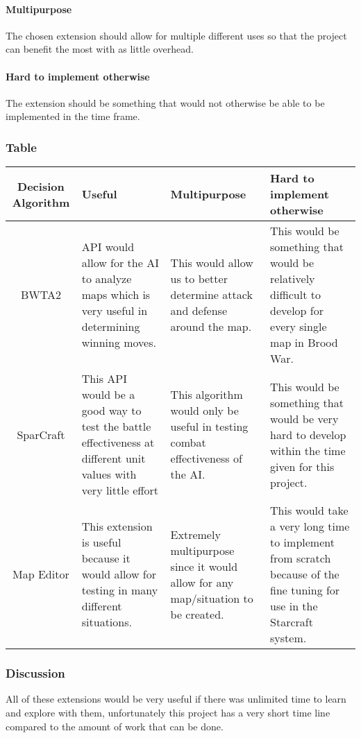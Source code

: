 \documentclass[10pt,letterpaper,onecolumn,draftclsnofoot]{IEEEtran}
\begin{document}
\paragraph{Multipurpose}
The chosen extension should allow for multiple different uses so that the project can benefit the most with as little overhead.
\paragraph{Hard to implement otherwise}
The extension should be something that would not otherwise be able to be implemented in the time frame. 
\subsubsection{Table}
\begin{center}
	\begin{tabular}{ ||C|M|M|M|| } 
		\hline
		Decision Algorithm & Useful & Multipurpose & Hard to implement otherwise \\
		\hline
		BWTA2 & API would allow for the AI to analyze maps which is very useful in determining winning moves. & This would allow us to better determine attack and defense around the map. & This would be something that would be relatively difficult to develop for every single map in Brood War. \\ 
		\hline
		SparCraft & This API would be a good way to test the battle effectiveness at different unit values with very little effort & This algorithm would only be useful in testing combat effectiveness of the AI. & This would be something that would be very hard to develop within the time given for this project. \\ 
		\hline
		Map Editor & This extension is useful because it would allow for testing in many different situations. & Extremely multipurpose since it would allow for any map/situation to be created. & This would take a very long time to implement from scratch because of the fine tuning for use in the Starcraft system. \\ 
		\hline
	\end{tabular}
\end{center}
\subsubsection{Discussion}
All of these extensions would be very useful if there was unlimited time to learn and explore with them, unfortunately this project has a very short time line compared to the amount of work that can be done. 
\end{document}
